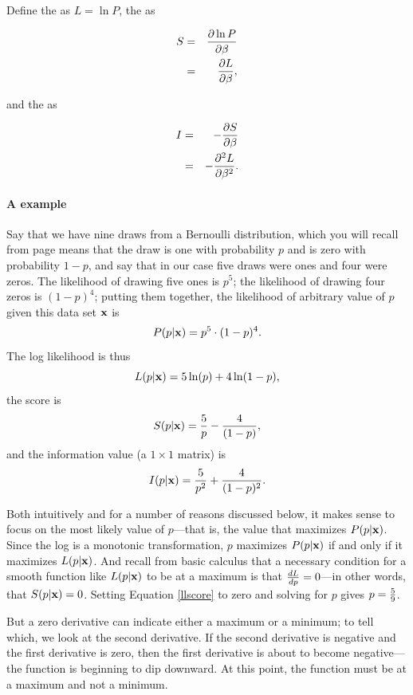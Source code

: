 Define the  as $L=\ln P$, the  as

\begin{eqnarray}
S&=&{\partial \ln P\over \partial \beta} \nonumber\\
&=&{\partial L \over \partial \beta},		\nonumber
\end{eqnarray}

and the  as

\begin{eqnarray}
I&=&-{\partial S \over \partial \beta}			\nonumber\\
&=&-{\partial^2 L \over \partial \beta^2}.		\nonumber
\end{eqnarray}

\paragraph{A  example} Say that we have nine draws from a
Bernoulli distribution, which you will recall from page \pageref{bernie}
means that the draw is one with probability $p$ and is zero with probability
$1-p$, and say that in our case five draws were ones and four were zeros. The likelihood
of drawing five ones is $p^5$; the likelihood of drawing four zeros is
$(1-p)^4$; putting them together, the likelihood of 
arbitrary value of $p$ given this data set ${\bf x}$ is
$$P(p|{\bf x}) = p^5\cdot (1-p)^4.$$
The log likelihood is thus
$$L(p|{\bf x}) = 5 \ln(p)+ 4 \ln(1-p),$$
the score is 
\begin{equation}
S(p|{\bf x}) = {5\over p} - {4\over (1-p)}, \label{llscore}
\end{equation}
and the information value (a $1\times1$ matrix) is
$$I(p|{\bf x}) = {5\over p^2} + {4\over (1-p)^2}.$$

Both intuitively and for a number of reasons discussed below, it makes
sense to focus on the most likely value of $p$---that is, the value that
maximizes $P(p|{\bf x})$. Since the log is a monotonic transformation, $p$
maximizes $P(p|{\bf x})$ if and only if it maximizes $L(p|{\bf x})$. And recall
from basic calculus that a necessary condition for a smooth function
like $L(p|{\bf x})$ to be at a maximum is that ${dL\over dp} = 0$---in other
words, that $S(p|{\bf x}) = 0$. Setting Equation \ref{llscore} to zero and
solving for $p$ gives $p={5\over 9}$. 

But a zero derivative can indicate either a maximum or a minimum; to
tell which, we look at the second derivative. If the second derivative
is negative and the first derivative is zero, then the first derivative
is about to become negative---the function is
beginning to dip downward. At this point, the function must be at a
maximum and not a minimum.

